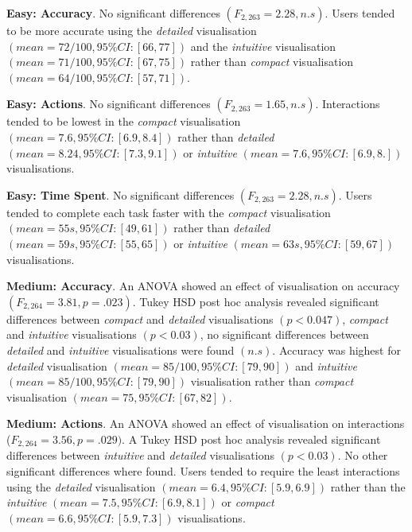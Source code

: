 \documentclass[final,5p,times,twocolumn,authoryear]{elsarticle}
\begin{document}

\textbf{Easy: Accuracy}. No significant differences $(F_{2, 263} = 2.28, n.s)$. Users tended to be more accurate using the \emph{detailed} visualisation $(mean=72/100, 95\% CI:[66,77])$ and the \emph{intuitive} visualisation $(mean=71/100, 95\% CI:[67,75])$ rather than \emph{compact} visualisation $(mean=64/100, 95\% CI:[57,71])$.
 
\textbf{Easy:  Actions}. No significant differences $(F_{2, 263} = 1.65, n.s)$. Interactions tended to be lowest in the \emph{compact} visualisation $(mean = 7.6, 95\% CI: [6.9, 8.4])$ rather than \emph{detailed} $(mean = 8.24, 95\% CI: [7.3, 9.1])$ or \emph{intuitive} $(mean = 7.6, 95\% CI: [6.9, 8. ])$  visualisations.

\textbf{Easy:  Time Spent}. No significant differences $(F_{2, 263} = 2.28, n.s)$. Users tended to complete each task faster with the \emph{compact} visualisation $(mean = 55s, 95\% CI: [49, 61])$ rather than \emph{detailed} $(mean = 59s, 95\% CI: [55, 65])$  or \emph{intuitive} $(mean = 63s, 95\% CI: [59, 67])$  visualisations.

\textbf{Medium:  Accuracy}. An ANOVA showed an effect of visualisation on accuracy $(F_{2, 264} = 3.81, p = .023)$. Tukey HSD post hoc analysis revealed significant differences between \emph{compact} and \emph{detailed} visualisations $(p < 0.047)$, \emph{compact} and \emph{intuitive} visualisations $(p < 0.03)$, no significant differences between \emph{detailed} and \emph{intuitive} visualisations were found $(n.s)$. Accuracy was highest for \emph{detailed} visualisation $(mean = 85/100, 95\% CI: [79, 90])$ and \emph{intuitive} $(mean = 85/100, 95\% CI: [79, 90])$ visualisation rather than \emph{compact} visualisation $(mean = 75, 95\% CI: [67, 82])$.

\textbf{Medium:  Actions}. An ANOVA showed an effect of visualisation on interactions ($F_{2, 264} = 3.56, p = .029)$. A Tukey HSD post hoc analysis revealed significant differences between \emph{intuitive} and \emph{detailed} visualisations $(p < 0.03)$. No other significant differences where found. Users tended to require the least interactions using the \emph{detailed} visualisation $(mean = 6.4, 95\% CI: [5.9, 6.9])$ rather than the \emph{intuitive} $(mean = 7.5, 95\% CI: [6.9, 8.1])$ or \emph{compact} $(mean = 6.6, 95\% CI: [5.9, 7.3])$ visualisations. 
\end{document}
